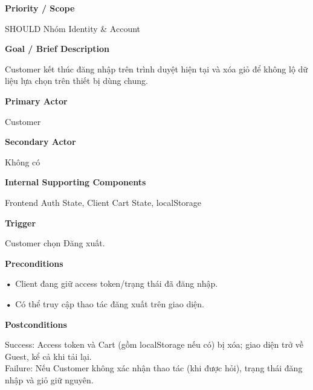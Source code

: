 \documentclass[11pt,a4paper,oneside]{report}
\begin{document}
\par\smallskip\noindent\textcolor{sgublue}{\textbf{Priority / Scope}}\par\nobreak
SHOULD \textbar{} Nhóm Identity \& Account
\par

\par\smallskip\noindent\textcolor{sgublue}{\textbf{Goal / Brief Description}}\par\nobreak
Customer kết thúc đăng nhập trên trình duyệt hiện tại và xóa giỏ để không lộ dữ liệu lựa chọn trên thiết bị dùng chung.
\par

\par\smallskip\noindent\textcolor{sgublue}{\textbf{Primary Actor}}\par\nobreak
Customer
\par

\par\smallskip\noindent\textcolor{sgublue}{\textbf{Secondary Actor}}\par\nobreak
Không có
\par

\par\smallskip\noindent\textcolor{sgublue}{\textbf{Internal Supporting Components}}\par\nobreak
Frontend Auth State, Client Cart State, localStorage
\par

\par\smallskip\noindent\textcolor{sgublue}{\textbf{Trigger}}\par\nobreak
Customer chọn Đăng xuất.
\par

\par\smallskip\noindent\textcolor{sgublue}{\textbf{Preconditions}}\par\nobreak
\textbf{•} Client đang giữ access token/trạng thái đã đăng nhập.

\textbf{•} Có thể truy cập thao tác đăng xuất trên giao diện.
\par

\par\smallskip\noindent\textcolor{sgublue}{\textbf{Postconditions}}\par\nobreak
Success: Access token và Cart (gồm localStorage nếu có) bị xóa; giao diện trở về Guest, kể cả khi tải lại.\\
Failure: Nếu Customer không xác nhận thao tác (khi được hỏi), trạng thái đăng nhập và giỏ giữ nguyên.\strut
\par
\end{document}

